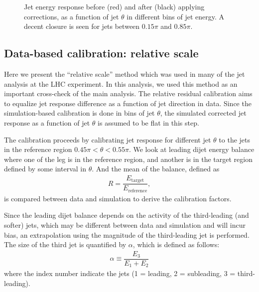 \begin{figure}[htp!]
    \centering
    \caption{Jet energy response before (red) and after (black) applying corrections, as a function of jet $\theta$ in different bins of jet energy.  A decent closure is seen for jets between $0.15\pi$ and $0.85\pi$.}
    \label{Figure:JetCalibration-JECPBin}
\end{figure}





\subsection{Data-based calibration: relative scale}
\label{Subsection:RelativeScale}

Here we present the ``relative scale'' method which was used in many of the jet analysis at the LHC experiment. In this analysis, we used this method as an important cross-check of the main analysis. The relative residual calibration aims to equalize jet response difference as a function of jet direction in data.  Since the simulation-based calibration is done in bins of jet $\theta$, the simulated corrected jet response as a function of jet $\theta$ is assumed to be flat in this step.

The calibration proceeds by calibrating jet response for different jet $\theta$ to the jets in the reference region $0.45\pi < \theta < 0.55\pi$.  We look at leading dijet energy balance where one of the leg is in the reference region, and another is in the target region defined by some interval in $\theta$.  And the mean of the balance, defined as
%
\begin{align}
    R = \dfrac{E_{\text{target}}}{E_{\text{reference}}},
\end{align}
%
is compared between data and simulation to derive the calibration factors.

Since the leading dijet balance depends on the activity of the third-leading (and softer) jets, which may be different between data and simulation and will incur bias, an extrapolation using the magnitude of the third-leading jet is performed.  The size of the third jet is quantified by $\alpha$, which is defined as follows:
%
\begin{align}
    \alpha \equiv \dfrac{E_{3}}{E_{1} + E_{2}}
\end{align}
%
where the index number indicate the jets (1 = leading, 2 = subleading, 3 = third-leading).

